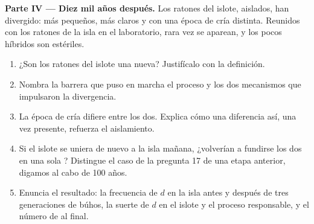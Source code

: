 \begin{problem}
\medskip
\noindent\textbf{Parte IV --- Diez mil años después.}
Los ratones del islote, aislados, han divergido: más pequeños, más
claros y con una época de cría distinta. Reunidos con los ratones de la
isla en el laboratorio, rara vez se aparean, y los pocos híbridos son
estériles.
\begin{enumerate}[resume]
  \item ¿Son los ratones del islote una  nueva? Justifícalo con
        la definición.
  \item Nombra la barrera que puso en marcha el proceso y los dos
        mecanismos que impulsaron la divergencia.
  \item La época de cría difiere entre los dos. Explica cómo una
        diferencia así, una vez presente, refuerza el aislamiento.
  \item Si el islote se uniera de nuevo a la isla mañana, ¿volverían a
        fundirse los dos en una sola ? Distingue el caso de la
        pregunta 17 de una etapa anterior, digamos al cabo de 100 años.
  \item Enuncia el resultado: la frecuencia de $d$ en la isla antes y
        después de tres generaciones de búhos, la suerte de $d$ en el
        islote y el proceso responsable, y el número de  al
        final.
\end{enumerate}
\end{problem}
